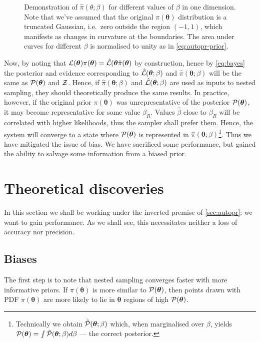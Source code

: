 \documentclass[usenatbib]{mnras}
\begin{document}
\begin{figure}
 
 \caption{\label{fig:ppr} Demonstration of
   \(\hat{\pi}(\theta; \beta)\) for different values of \(\beta\) in
   one dimension. Note that we've assumed that the original
   \( \pi (\bm{\theta})\) distribution is a truncated Gaussian,
   i.e.~zero outside the region \((-1, 1)\), which manifests as
   changes in curvature at the boundaries. The area under curves for
   different $\beta$ is normalised to unity as in
   \cref{eq:autopr-prior}. }
\end{figure}

Now, by noting that
\({\cal L}(\bm{\theta})\pi (\bm{\theta}) = \hat{\cal L}(\bm{\theta}
\hat{\pi} (\bm{\theta})\) by construction, hence by \cref{eq:bayes}
the posterior and evidence corresponding to
\(\hat{\cal L}(\bm{\theta};\beta)\) and
\(\hat{\pi} (\bm{\theta};\beta)\) will be the same as
\( {\cal P} (\bm{\theta})\) and \({\cal Z}\). Hence, if
\(\hat{\pi} (\bm{\theta};\beta)\) and
\(\hat{\cal L}(\bm{\theta};\beta)\) are used as inputs to nested
sampling, they should theoretically produce the same results. In
practice, however, if the original prior \(\pi (\bm{\theta})\) was
unrepresentative of the posterior \( {\cal P} (\bm{\theta})\), it may
become representative for some value $\beta_{R}$. Values $\hat{\beta}$
close to $\beta_{R}$ will be correlated with higher likelihoods, thus
the sampler shall prefer them. Hence, the system will converge to a
state where \( {\cal P} (\bm{\theta})\) is represented in
\(\hat{\pi} (\bm{\theta};\beta)\)\footnote{Technically we obtain
  \( \hat{\cal P} (\bm{\theta};\beta)\) which, when marginalised over
  $\beta$, yields
  \( {\cal P} (\bm{\theta}) = \int \hat{\cal P} (\bm{\theta};\beta) d
  \beta\) --- the correct posterior.}. Thus we have mitigated the
issue of bias. We have sacrificed some performance, but gained the
ability to salvage some information from a biased prior.


\section{Theoretical discoveries}
In this section we shall be working under the inverted premise of
\cref{sec:autopr}: we want to gain performance. As we shall see, this
necessitates neither a loss of accuracy nor precision. 

\subsection{Biases\label{discussion-bias}}
The first step is to note that nested sampling converges faster with
more informative priors. If \(\pi (\bm{\theta})\) is more similar to
\( {\cal P} (\bm{\theta})\), then points drawn with PDF
\(\pi (\bm{\theta})\) are more likely to lie in $\bm{\theta}$ regions
of high \( {\cal P} (\bm{\theta})\).
\end{document}
